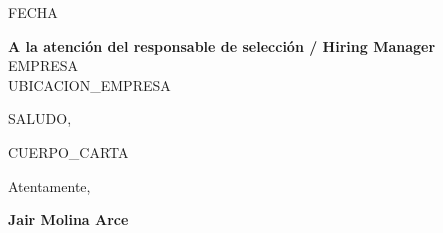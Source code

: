 \documentclass[11pt,a4paper]{article}
\begin{document}

\vspace{1cm}

\hfill {{FECHA}}

\vspace{0.5cm}

\textbf{A la atención del responsable de selección / Hiring Manager}\\[0pt]
{{EMPRESA}}\\[0pt]
{{UBICACION_EMPRESA}}

\vspace{1cm}

{{SALUDO}},

\vspace{0.5cm}

{{CUERPO_CARTA}}

\vspace{1cm}

Atentamente,

\vspace{1cm}

\textbf{Jair Molina Arce}
\end{document}

